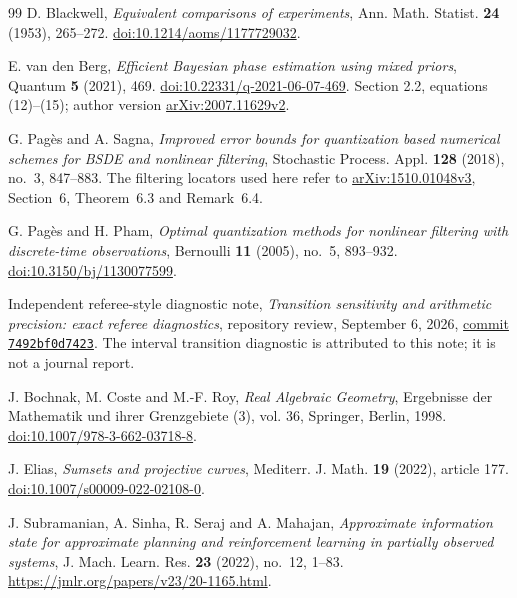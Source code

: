 \begin{thebibliography}{99}
D. Blackwell, \emph{Equivalent comparisons of experiments},
Ann. Math. Statist. \textbf{24} (1953), 265--272.
\href{https://doi.org/10.1214/aoms/1177729032}{doi:10.1214/aoms/1177729032}.

E. van den Berg, \emph{Efficient Bayesian phase estimation using mixed
priors}, Quantum \textbf{5} (2021), 469.
\href{https://doi.org/10.22331/q-2021-06-07-469}{doi:10.22331/q-2021-06-07-469}.
Section 2.2, equations (12)--(15); author version
\href{https://arxiv.org/abs/2007.11629v2}{arXiv:2007.11629v2}.

G. Pag\`es and A. Sagna, \emph{Improved error bounds for quantization
based numerical schemes for BSDE and nonlinear filtering},
Stochastic Process. Appl. \textbf{128} (2018), no.~3, 847--883.
The filtering locators used here refer to
\href{https://arxiv.org/abs/1510.01048v3}{arXiv:1510.01048v3},
Section~6, Theorem~6.3 and Remark~6.4.

G. Pag\`es and H. Pham, \emph{Optimal quantization methods for nonlinear
filtering with discrete-time observations}, Bernoulli \textbf{11}
(2005), no.~5, 893--932.
\href{https://doi.org/10.3150/bj/1130077599}{doi:10.3150/bj/1130077599}.

Independent referee-style diagnostic note,
\emph{Transition sensitivity and arithmetic precision: exact referee diagnostics},
repository review, September 6, 2026,
\href{https://github.com/TrillionniumFoundation/theta-theory/blob/7492bf0d74236e866048ef9e5e5b28e4ea9a7f56/reviews/a1-english-v11-certified-memory-2026-09-06/TECHNICAL_NOTE.md}{commit \texttt{7492bf0d7423}}.
The interval transition diagnostic is attributed to this note;
it is not a journal report.

J. Bochnak, M. Coste and M.-F. Roy, \emph{Real Algebraic Geometry},
Ergebnisse der Mathematik und ihrer Grenzgebiete (3), vol. 36,
Springer, Berlin, 1998.
\href{https://doi.org/10.1007/978-3-662-03718-8}{doi:10.1007/978-3-662-03718-8}.

J. Elias, \emph{Sumsets and projective curves},
Mediterr. J. Math. \textbf{19} (2022), article 177.
\href{https://doi.org/10.1007/s00009-022-02108-0}{doi:10.1007/s00009-022-02108-0}.

J. Subramanian, A. Sinha, R. Seraj and A. Mahajan,
\emph{Approximate information state for approximate planning and
reinforcement learning in partially observed systems}, J. Mach. Learn.
Res. \textbf{23} (2022), no.~12, 1--83.
\url{https://jmlr.org/papers/v23/20-1165.html}.


\end{thebibliography}
